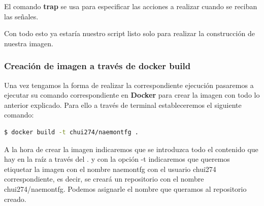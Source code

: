 El comando \textbf{trap} se usa para especificar las acciones a realizar cuando se reciban las señales.

Con todo esto ya estaría nuestro script listo solo para realizar la construcción de nuestra imagen.

\subsubsection{Creación de imagen a través de docker build}
Una vez tengamos la forma de realizar la correspondiente ejecución pasaremos a ejecutar su comando correspondiente en \textbf{Docker} para crear la imagen con todo lo anterior explicado. Para ello a través de terminal estableceremos el siguiente comando:
\begin{lstlisting}[language=bash]
$ docker build -t chui274/naemontfg .
\end{lstlisting}
\newpage
A la hora de crear la imagen indicaremos que se introduzca todo el contenido que hay en la raíz a través del . y con la opción -t indicaremos que queremos etiquetar la imagen con el nombre naemontfg con el usuario chui274 correspondiente, es decir, se creará un repositorio con el nombre chui274/naemontfg. Podemos asignarle el nombre que queramos al repositorio creado.
